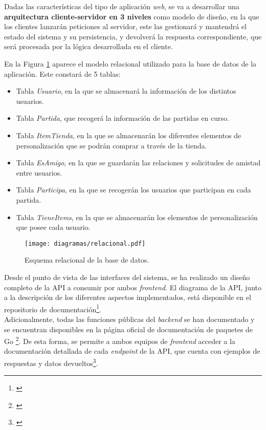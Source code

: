 \documentclass[11pt, a4paper, titlepage]{article}
\begin{document}
\FloatBarrier

Dadas las características del tipo de aplicación \textit{web}, se va a desarrollar una \textbf{arquitectura cliente-servidor en 3 niveles} como modelo de diseño, en la que los clientes lanzarán peticiones al servidor, este las gestionará y mantendrá el estado del sistema y su persistencia, y devolverá la respuesta correspondiente, que será procesada por la lógica desarrollada en el cliente. \\

\newpage

En la Figura \ref{ref:relacional} aparece el modelo relacional utilizado para la base de datos de la aplicación. Este constará de 5 tablas:
\begin{itemize}
    \item Tabla \textit{Usuario}, en la que se almacenará la información de los distintos usuarios.
    \item Tabla \textit{Partida}, que recogerá la información de las partidas en curso.
    \item Tabla \textit{ItemTienda}, en la que se almacenarán los diferentes elementos de personalización que se podrán comprar a través de la tienda.
    \item Tabla \textit{EsAmigo}, en la que se guardarán las relaciones y solicitudes de amistad entre usuarios.
    \item Tabla \textit{Participa}, en la que se recogerán los usuarios que participan en cada partida.
    \item Tabla \textit{TieneItems}, en la que se almacenarán los elementos de personalización que posee cada usuario.
\end{itemize}
\begin{figure}[!h]
    \centering
    \texttt{[image: diagramas/relacional.pdf]}
    \caption{Esquema relacional de la base de datos.}
    \label{ref:relacional}
\end{figure}

Desde el punto de vista de las interfaces del sistema, se ha realizado un diseño completo de la API a consumir por ambos \textit{frontend}. El diagrama de la API, junto a la descripción de los diferentes aspectos implementados, está disponible en el repositorio de documentación\footnote{\href{https://github.com/UNIZAR-30226-2022-01/proyecto_software_documentacion/documentacion_API.md}{\color{blue}{Documentación de la API.}}}. \\

Adicionalmente, todas las funciones públicas del \textit{backend} se han documentado y se encuentran disponibles en la página oficial de documentación de paquetes de Go \footnote{\href{https://pkg.go.dev/github.com/UNIZAR-30226-2022-01/proyecto_software_backend}{}}. De esta forma, se permite a ambos equipos de \textit{frontend} acceder a la documentación detallada de cada \textit{endpoint} de la API, que cuenta con ejemplos de respuestas y datos devueltos\footnote{\href{https://pkg.go.dev/github.com/UNIZAR-30226-2022-01/proyecto_software_backend/handlers}{}}.
\end{document}
